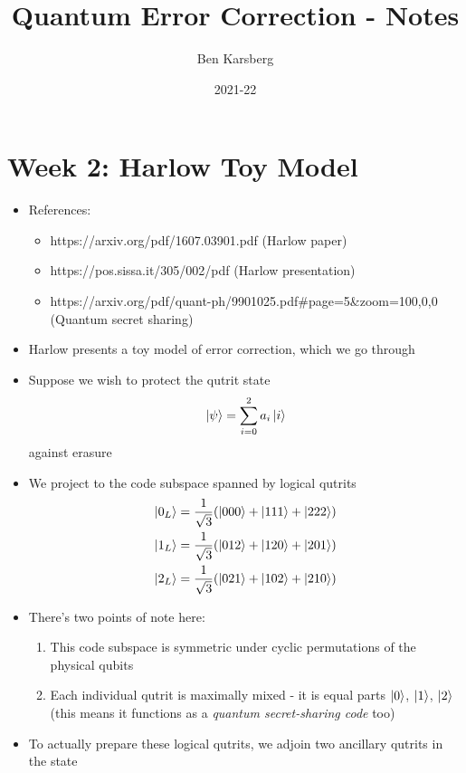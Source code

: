 \documentclass[12pt,a4paper]{article}
\title{Quantum Error Correction - Notes}
\author{Ben Karsberg}
\date{2021-22}
\numberwithin{equation}{section}
\begin{document}
	\maketitle
	\section{Week 2: Harlow Toy Model}
	\begin{itemize}
		\item References:
		\begin{itemize}
			\item https://arxiv.org/pdf/1607.03901.pdf (Harlow paper)
			\item https://pos.sissa.it/305/002/pdf (Harlow presentation)
			\item https://arxiv.org/pdf/quant-ph/9901025.pdf\#page=5\&zoom=100,0,0 (Quantum secret sharing)
		\end{itemize}
		\item Harlow presents a toy model of error correction, which we go through
		\item Suppose we wish to protect the qutrit state
		\begin{equation}
			\ket{\psi}=\sum_{i=0}^{2}a_{i}\ket{i}
		\end{equation}
		against erasure
		\item We project to the code subspace spanned by logical qutrits
		\begin{equation}
			\begin{aligned}
				\ket{0_{L}}&=\frac{1}{\sqrt{3}}(\ket{000}+\ket{111}+\ket{222})\\
				\ket{1_{L}}&=\frac{1}{\sqrt{3}}(\ket{012}+\ket{120}+\ket{201})\\
				\ket{2_{L}}&=\frac{1}{\sqrt{3}}(\ket{021}+\ket{102}+\ket{210})
			\end{aligned}
		\end{equation}
		\item There's two points of note here:
		\begin{enumerate}
			\item This code subspace is symmetric under cyclic permutations of the physical qubits
			\item Each individual qutrit is maximally mixed - it is equal parts $\ket{0}$, $\ket{1}$, $\ket{2}$ (this means it functions as a \textit{quantum secret-sharing code} too)
		\end{enumerate}
		\item To actually prepare these logical qutrits, we adjoin two ancillary qutrits in the state

\end{itemize}
\end{document}
